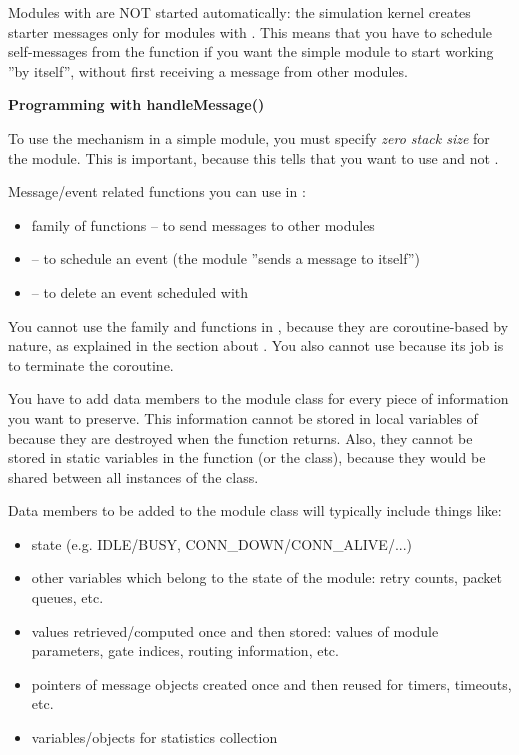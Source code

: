 Modules with  are NOT started automatically:
the simulation kernel creates starter messages
only for modules with . This means that you have to
schedule self-messages from the
 function if you want the 
simple module to start working ''by itself'', without first receiving
a message from other modules.


\textbf{Programming with handleMessage()}


To use the  mechanism in a
simple module, you must specify \textit{zero
  stack size} for the module. This is
important, because this tells {\opp} that you want to use
 and not .

Message/event related functions you can use in :
\begin{itemize}
\item{ family of functions -- to send messages to other modules}
\item{ -- to schedule an event (the module ''sends 
a message to itself'')}
\item{ -- to delete an event scheduled with }
\end{itemize}

You cannot use the  family and
 functions in , because they are
coroutine-based by nature, as explained in the section about
. You also cannot use  because its job
is to terminate the coroutine.


You have to add data members to the module class for every piece 
of information you want to preserve. This information cannot 
be stored in local variables of  because they 
are destroyed when the function returns. Also, they cannot be 
stored in static variables in the function (or the class), because 
they would be shared between all instances of the class.


Data members to be added to the module class will typically include 
things like:
\begin{itemize}
\item{state (e.g. IDLE/BUSY, CONN\_DOWN/CONN\_ALIVE/...)}
\item{other variables which belong to the state of the module: retry 
    counts, packet queues, etc.}
\item{values retrieved/computed once and then stored: values of module 
    parameters, gate indices, routing information, etc.}
\item{pointers of message objects created once and then reused for 
    timers, timeouts, etc.}
\item{variables/objects for statistics collection}
\end{itemize}

